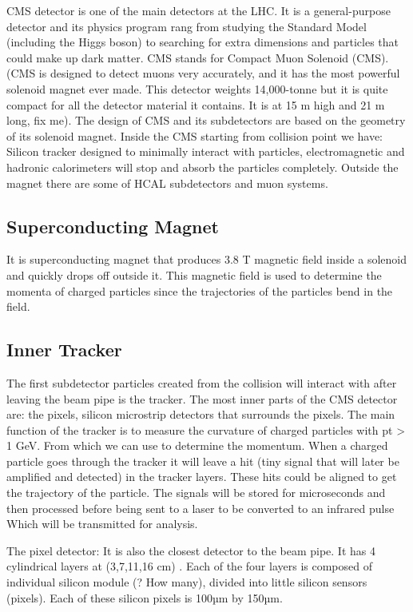 
CMS detector is one of the main detectors at the LHC. It is a general-purpose detector and its physics program rang from studying the Standard Model
(including the Higgs boson) to searching for extra dimensions and particles that could make up dark matter.
CMS stands for Compact Muon Solenoid (CMS). (CMS is designed to detect muons very accurately, and it has the most powerful solenoid magnet ever made.
This detector weights 14,000-tonne but it is quite compact for all the detector material it contains. It is at 15 m high and 21 m long, fix me).
The design of CMS and its subdetectors are based on the geometry of its solenoid magnet. Inside the CMS starting from collision point we have: Silicon tracker designed to minimally interact with particles, electromagnetic and hadronic calorimeters will stop and absorb the particles completely.
Outside the magnet there are some of HCAL subdetectors and muon systems.

\subsection{Superconducting Magnet} 
It is superconducting magnet that produces 3.8 T magnetic field inside a solenoid and quickly drops off outside it. This magnetic field is used to determine the momenta of charged particles since the trajectories of the particles bend in the field.

\subsection{Inner Tracker} 
The first subdetector particles created from the collision will interact with after leaving the beam pipe is the tracker. The most inner parts of the CMS detector are: the pixels, silicon microstrip detectors that surrounds the pixels. The main function of the tracker is to measure the curvature of charged particles with pt > 1 GeV. From which we can use to determine the momentum. When a charged particle goes through the tracker it will leave a hit (tiny signal that will later be amplified and detected) in the tracker layers. These hits could be aligned to get the trajectory of the particle. The signals will be stored for microseconds and then processed before being sent to a laser to be converted to an infrared pulse Which will be transmitted for analysis.

The pixel detector: It is also the closest detector to the beam pipe. It has 4 cylindrical layers at (3,7,11,16 cm) . Each of the four layers is composed of individual silicon module (? How many), divided into little silicon sensors (pixels).  Each of these silicon pixels is 100µm by 150µm.

